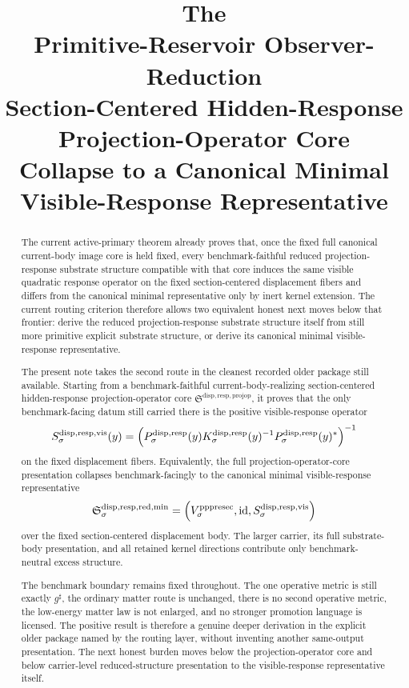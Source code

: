 \documentclass[11pt]{article}
\title{\textbf{The \TheoryName{}}\\[0.4em]
\large Primitive-Reservoir Observer-Reduction\\
\large Section-Centered Hidden-Response\\
\large Projection-Operator Core\\
\large Collapse to a Canonical Minimal\\
\large Visible-Response Representative}
\author{}
\date{}
\newcommand{\CompletedMetric}{g^{\sharp}}
\newcommand{\PrePreProtoSectionVertical}[1]{V_{#1}^{\mathrm{pppresec}}}
\newcommand{\ProjectionOperatorCore}{\mathfrak S^{\mathrm{disp,resp,projop}}}
\newcommand{\SubstrateProjection}[1]{P_{#1}^{\mathrm{disp,resp}}}
\newcommand{\SubstrateOperator}[1]{K_{#1}^{\mathrm{disp,resp}}}
\newcommand{\VisibleResponseOperator}[1]{S_{#1}^{\mathrm{disp,resp,vis}}}
\newcommand{\MinimalReducedStructure}{\mathfrak S^{\mathrm{disp,resp,red,min}}}
\begin{document}
\maketitle

\begin{abstract}
The current active-primary theorem already proves that, once the fixed full canonical current-body image core is held fixed, every benchmark-faithful reduced projection-response substrate structure compatible with that core induces the same visible quadratic response operator on the fixed section-centered displacement fibers and differs from the canonical minimal representative only by inert kernel extension. The current routing criterion therefore allows two equivalent honest next moves below that frontier: derive the reduced projection-response substrate structure itself from still more primitive explicit substrate structure, or derive its canonical minimal visible-response representative.

The present note takes the second route in the cleanest recorded older package still available. Starting from a benchmark-faithful current-body-realizing section-centered hidden-response projection-operator core \(\ProjectionOperatorCore\), it proves that the only benchmark-facing datum still carried there is the positive visible-response operator
\[
\VisibleResponseOperator{\sigma}(y)
=
\Bigl(
\SubstrateProjection{\sigma}(y)\SubstrateOperator{\sigma}(y)^{-1}\SubstrateProjection{\sigma}(y)^*
\Bigr)^{-1}
\]
on the fixed displacement fibers. Equivalently, the full projection-operator-core presentation collapses benchmark-facingly to the canonical minimal visible-response representative
\[
\MinimalReducedStructure_{\sigma}
=
\Bigl(
\PrePreProtoSectionVertical{\sigma},
\mathrm{id},
\VisibleResponseOperator{\sigma}
\Bigr)
\]
over the fixed section-centered displacement body. The larger carrier, its full substrate-body presentation, and all retained kernel directions contribute only benchmark-neutral excess structure.

The benchmark boundary remains fixed throughout. The one operative metric is still exactly \(\CompletedMetric\), the ordinary matter route is unchanged, there is no second operative metric, the low-energy matter law is not enlarged, and no stronger promotion language is licensed. The positive result is therefore a genuine deeper derivation in the explicit older package named by the routing layer, without inventing another same-output presentation. The next honest burden moves below the projection-operator core and below carrier-level reduced-structure presentation to the visible-response representative itself.
\end{abstract}
\end{document}
